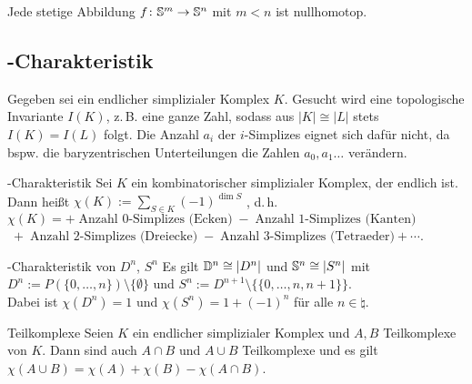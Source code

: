 \begin{Kor}
    Jede stetige Abbildung $f\colon \mathbb{S}^m \rightarrow \mathbb{S}^n$
    mit $m < n$ ist nullhomotop.
\end{Kor}

\pagebreak

\subsection{%
    -Charakteristik%
}

\begin{Bem}
    Gegeben sei ein endlicher simplizialer Komplex $K$.
    Gesucht wird eine topologische Invariante $I(K)$, z.\,B. eine ganze Zahl,
    sodass aus $|K| \cong |L|$ stets $I(K) = I(L)$ folgt.
    Die Anzahl $a_i$ der $i$-Simplizes eignet sich dafür nicht, da bspw. die
    baryzentrischen Unterteilungen die Zahlen $a_0, a_1 \dotsc$ verändern.
\end{Bem}

\begin{Def}{-Charakteristik}
    Sei $K$ ein kombinatorischer simplizialer Komplex, der endlich ist. \\
    Dann heißt $\chi(K) := \sum_{S \in K} (-1)^{\dim S}$
    , d.\,h. \\
    $\chi(K) = +\; \text{Anzahl 0-Simplizes (Ecken)}
    \;-\; \text{Anzahl 1-Simplizes (Kanten)}$ \\
    $\;+\; \text{Anzahl 2-Simplizes (Dreiecke)}
    \;-\; \text{Anzahl 3-Simplizes (Tetraeder)} + \dotsb$.
\end{Def}

\begin{Satz}{-Charakteristik von $D^n$, $S^n$}
    Es gilt $\mathbb{D}^n \cong |D^n|$ und $\mathbb{S}^n \cong |S^n|$ mit \\
    $D^n := P(\{0, \dotsc, n\}) \setminus \{\emptyset\}$ und
    $S^n := D^{n+1} \setminus \{\{0, \dotsc, n, n + 1\}\}$. \\
    Dabei ist $\chi(D^n) = 1$ und $\chi(S^n) = 1 + (-1)^n$ für alle
    $n \in \natural$.
\end{Satz}

\begin{Satz}{Teilkomplexe}
    Seien $K$ ein endlicher simplizialer Komplex und $A, B$
    Teilkomplexe von $K$.
    Dann sind auch $A \cap B$ und $A \cup B$ Teilkomplexe und es gilt
    $\chi(A \cup B) = \chi(A) + \chi(B) - \chi(A \cap B)$.
\end{Satz}

